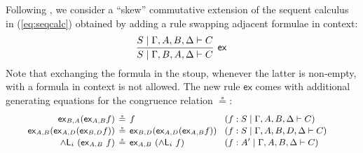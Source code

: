 \documentclass[submission,copyright,creativecommons]{eptcs}
\theoremstyle{definition}
\newcommand{\tl}{\otimes \mathsf{L}}
\newcommand{\tr}{\otimes \mathsf{R}}
\newcommand{\pass}{\mathsf{pass}}
\newcommand{\unitl}{\mathsf{IL}}
\newcommand{\andlone}{\land \mathsf{L}_{1}}
\newcommand{\andli}{\land \mathsf{L}_{i}}
\newcommand{\ex}{\mathsf{ex}}
\begin{document}
Following \cite{veltri:coherence:2021}, we consider a ``skew'' commutative extension of the sequent calculus in (\ref{eq:seqcalc}) obtained by adding a rule swapping adjacent  formulae in context:
\begin{displaymath}
  \infer[\ex]{S \mid \Gamma , B , A , \Delta \vdash C}{
    S \mid \Gamma , A , B , \Delta \vdash C
  }
\end{displaymath}
Note that exchanging the formula in the stoup, whenever the latter is non-empty, with a formula in context is not allowed. The new rule $\ex$ comes with additional generating equations for the congruence relation $\circeq$:
\begin{equation*}\label{fig:circeq:sym}
  \small
  \arraycolsep=2pt
  \def\arraystretch{1.1}
  \hspace{-8.9pt}
\begin{array}{rclll}
\ex_{B , A}  (\ex_{A , B}  f) &\circeq & f &&(f: S \mid \Gamma , A , B , \Delta \vdash C)
\\
\ex_{A , B}  (\ex_{A , D}  (\ex_{B , D}  f)) &\circeq & \ex_{B , D}  (\ex_{A , D}  (\ex_{A , B}  f)) &&(f : S \mid \Gamma , A , B , D , \Delta \vdash C) 
\\
  \andli \ (\ex_{A , B} \ f) &\circeq &\ex_{A , B} \ (\andli \ f) &&(f : A' \mid \Gamma , A , B , \Delta \vdash C)

\end{array}
\end{equation*}
\end{document}
